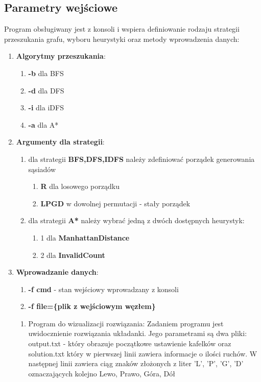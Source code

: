 \documentclass{classrep}
\begin{document}
		\subsection{Parametry wejściowe}
			Program obsługiwany jest z konsoli i wspiera definiowanie rodzaju strategii przeszukania grafu,
			wyboru heurystyki oraz metody wprowadzenia danych:
			\begin{enumerate}
				\item \textbf{Algorytmy przeszukania}:
				\begin{enumerate}
					\item \textbf{-b} dla BFS
					\item \textbf{-d} dla DFS
					\item \textbf{-i} dla iDFS
					\item \textbf{-a} dla A*
				\end{enumerate}
				\item \textbf{Argumenty dla strategii}:
				\begin{enumerate}
					\item dla strategii \textbf{BFS,DFS,IDFS} należy zdefiniować porządek generowania sąsiadów
					\begin{enumerate}
						\item \textbf{R} dla losowego porządku
						\item \textbf{LPGD} w dowolnej permutacji - stały porządek
					\end{enumerate}
					\item dla strategii \textbf{A*} należy wybrać jedną z dwóch dostępnych heurystyk:
					\begin{enumerate}
						\item 1 dla \textbf{ManhattanDistance}
						\item 2 dla \textbf{InvalidCount}
					\end{enumerate}
				\end{enumerate}
				\item \textbf{Wprowadzanie danych}:
				\begin{enumerate}
					\item \textbf{-f cmd} - stan wejściowy wprowadzany z konsoli
					\item \textbf{-f file=\{plik z wejściowym węzłem\}}
				\end{enumerate}
				\begin{enumerate}
					\item Program do wizualizacji rozwiązania:
					Zadaniem programu jest uwidocznienie rozwiązania układanki. Jego parametrami są dwa pliki: output.txt - który obrazuje początkowe ustawienie kafelków oraz solution.txt który w pierwszej linii zawiera informacje o ilości ruchów. W następnej linii zawiera ciąg znaków złożonych z liter 'L', 'P', 'G', 'D' oznaczających kolejno Lewo, Prawo, Góra, Dół 
				\end{enumerate}
			\end{enumerate}
\end{document}
